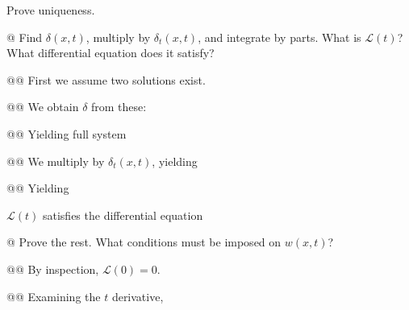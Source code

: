 \documentclass[10pt]{article}
\begin{document}
Prove uniqueness.

    \begin{easylist}[enumerate]
        @ Find $\delta(x, t)$, multiply by $\delta_t(x, t)$, and integrate by parts. What is $\mathcal{L}(t)$? What
        differential equation does it satisfy?

        @@ First we assume two solutions exist.

        @@ We obtain $\delta$ from these:


        @@ Yielding full system


        @@ We multiply by $\delta_t(x, t)$, yielding


        @@ Yielding


        $\mathcal{L}(t)$ satisfies the differential equation


        @ Prove the rest. What conditions must be imposed on $w(x, t)$?

        @@ By inspection, $\mathcal{L}(0) = 0$.

        @@ Examining the $t$ derivative,



\end{easylist}
\end{document}
